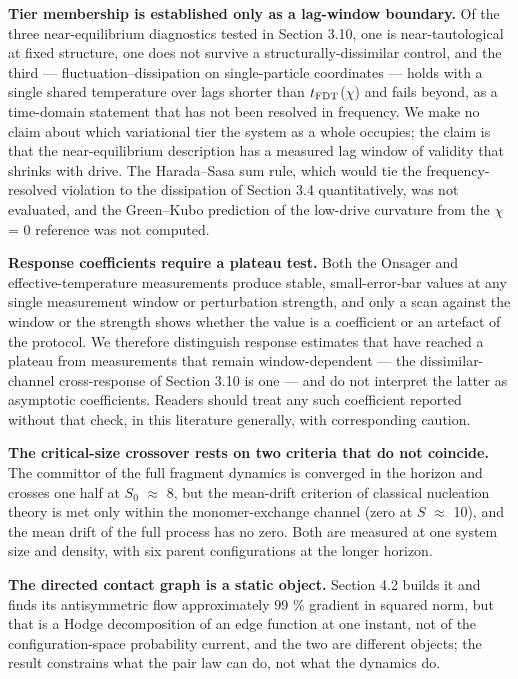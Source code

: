 \documentclass[aps,pre,preprint,superscriptaddress,nofootinbib,longbibliography]{revtex4-2}
\begin{document}
\textbf{Tier membership is established only as a lag-window boundary.} Of the three near-equilibrium diagnostics tested in Section 3.10, one is near-tautological at fixed structure, one does not survive a structurally-dissimilar control, and the third --- fluctuation--dissipation on single-particle coordinates --- holds with a single shared temperature over lags shorter than $t_{\rm FDT}$($\chi$) and fails beyond, as a time-domain statement that has not been resolved in frequency. We make no claim about which variational tier the system as a whole occupies; the claim is that the near-equilibrium description has a measured lag window of validity that shrinks with drive. The Harada--Sasa sum rule, which would tie the frequency-resolved violation to the dissipation of Section 3.4 quantitatively, was not evaluated, and the Green--Kubo prediction of the low-drive curvature from the $\chi$ = 0 reference was not computed.

\textbf{Response coefficients require a plateau test.} Both the Onsager and effective-temperature measurements produce stable, small-error-bar values at any single measurement window or perturbation strength, and only a scan against the window or the strength shows whether the value is a coefficient or an artefact of the protocol. We therefore distinguish response estimates that have reached a plateau from measurements that remain window-dependent --- the dissimilar-channel cross-response of Section 3.10 is one --- and do not interpret the latter as asymptotic coefficients. Readers should treat any such coefficient reported without that check, in this literature generally, with corresponding caution.

\textbf{The critical-size crossover rests on two criteria that do not coincide.} The committor of the full fragment dynamics is converged in the horizon and crosses one half at $S_0$ $\approx$ 8, but the mean-drift criterion of classical nucleation theory is met only within the monomer-exchange channel (zero at $S$ $\approx$ 10), and the mean drift of the full process has no zero. Both are measured at one system size and density, with six parent configurations at the longer horizon.

\textbf{The directed contact graph is a static object.} Section 4.2 builds it and finds its antisymmetric flow approximately 99 \% gradient in squared norm, but that is a Hodge decomposition of an edge function at one instant, not of the configuration-space probability current, and the two are different objects; the result constrains what the pair law can do, not what the dynamics do.
\end{document}
